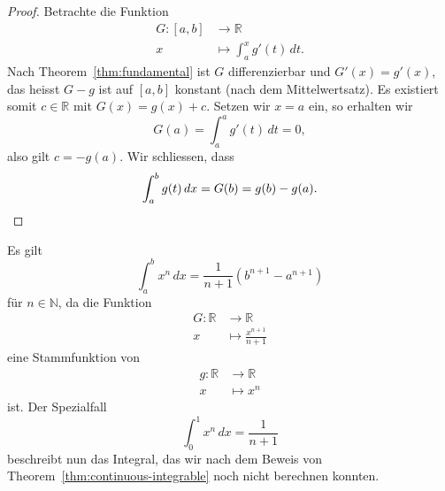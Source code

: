 \documentclass[../main.tex]{subfiles}
\begin{document}
\begin{proof}
  Betrachte die Funktion
  \begin{align*}
    G \colon [a, b] & \to \mathbb{R} \\
    x & \mapsto \int_{a}^{x} g'(t) \, dt.
  \end{align*}
  Nach Theorem~\ref{thm:fundamental} ist $G$ differenzierbar
  und $G'(x) = g'(x)$, das heisst $G - g$ ist auf
  $[a, b]$ konstant (nach dem Mittelwertsatz).
  Es existiert somit $c \in \mathbb{R}$ mit $G(x) = g(x) + c$.
  Setzen wir $x = a $ ein, so erhalten wir
  \[
    G(a) = \int_{a}^{a} g'(t) \, dt = 0,
  \]
  also gilt $c = -g(a)$. Wir schliessen, dass
  \[
    \int_{a}^{b} g(t) \, dx = G(b) = g(b) - g(a). \qedhere
  \]
\end{proof}

\begin{example}
  Es gilt
  \[
    \int_{a}^{b} x^n \, dx = \frac{1}{n+1} (b^{n+1} - a^{n+1})
  \]
  für $n \in \mathbb{N}$, da die Funktion
  \begin{align*}
    G \colon \mathbb{R} & \to \mathbb{R} \\
    x & \mapsto \frac{x^{n+1}}{n+1}
  \end{align*}
  eine Stammfunktion von
  \begin{align*}
    g \colon \mathbb{R} & \to \mathbb{R} \\
    x & \mapsto x^n
  \end{align*}
  ist. Der Spezialfall
  \[
    \int_{0}^{1} x^n \, dx = \frac{1}{n+1}
  \]
  beschreibt nun das Integral, das wir nach
  dem Beweis von Theorem~\ref{thm:continuous-integrable}
  noch nicht berechnen konnten.
\end{example}
\end{document}
